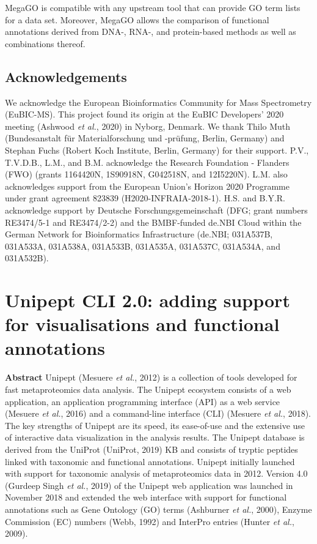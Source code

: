 MegaGO is compatible with any upstream tool that can provide GO term
lists for a data set. Moreover, MegaGO allows the comparison of
functional annotations derived from DNA-, RNA-, and protein-based
methods as well as combinations thereof.

\hypertarget{acknowledgements-2}{%
\section{Acknowledgements}\label{acknowledgements-2}}

We acknowledge the European Bioinformatics Community for Mass
Spectrometry (EuBIC-MS). This project found its origin at the EuBIC
Developers' 2020 meeting (Ashwood \emph{et al.}, 2020) in Nyborg,
Denmark. We thank Thilo Muth (Bundesanstalt für Materialforschung und
-prüfung, Berlin, Germany) and Stephan Fuchs (Robert Koch Institute,
Berlin, Germany) for their support. P.V., T.V.D.B., L.M., and B.M.
acknowledge the Research Foundation - Flanders (FWO) (grants 1164420N,
1S90918N, G042518N, and 12I5220N). L.M. also acknowledges support from
the European Union's Horizon 2020 Programme under grant agreement 823839
(H2020-INFRAIA-2018-1). H.S. and B.Y.R. acknowledge support by Deutsche
Forschungsgemeinschaft (DFG; grant numbers RE3474/5-1 and RE3474/2-2)
and the BMBF-funded de.NBI Cloud within the German Network for
Bioinformatics Infrastructure (de.NBI; 031A537B, 031A533A, 031A538A,
031A533B, 031A535A, 031A537C, 031A534A, and 031A532B).

\hypertarget{unipept-cli-2.0-adding-support-for-visualisations-and-functional-annotations}{%
\chapter{Unipept CLI 2.0: adding support for visualisations and
functional
annotations}\label{unipept-cli-2.0-adding-support-for-visualisations-and-functional-annotations}}

\textbf{Abstract} Unipept (Mesuere \emph{et al.}, 2012) is a collection
of tools developed for fast metaproteomics data analysis. The Unipept
ecosystem consists of a web application, an application programming
interface (API) as a web service (Mesuere \emph{et al.}, 2016) and a
command-line interface (CLI) (Mesuere \emph{et al.}, 2018). The key
strengths of Unipept are its speed, its ease-of-use and the extensive
use of interactive data visualization in the analysis results. The
Unipept database is derived from the UniProt (UniProt, 2019) KB and
consists of tryptic peptides linked with taxonomic and functional
annotations. Unipept initially launched with support for taxonomic
analysis of metaproteomics data in 2012. Version 4.0 (Gurdeep Singh
\emph{et al.}, 2019) of the Unipept web application was launched in
November 2018 and extended the web interface with support for functional
annotations such as Gene Ontology (GO) terms (Ashburner \emph{et al.},
2000), Enzyme Commission (EC) numbers (Webb, 1992) and InterPro entries
(Hunter \emph{et al.}, 2009).

